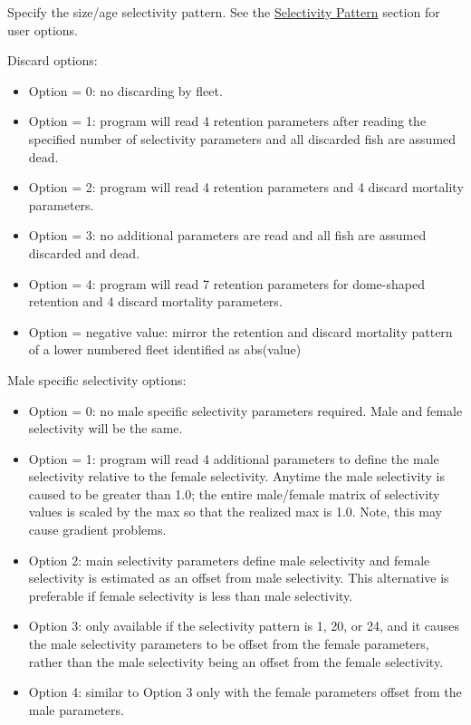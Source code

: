 Specify the size/age selectivity pattern. See the \hyperlink{SelexPattern}{Selectivity Pattern} section for user options.

\hypertarget{DomeRetention}{}
Discard options:
\begin{itemize}
	\item Option = 0: no discarding by fleet.
	\item Option = 1: program will read 4 retention parameters after reading the specified number of selectivity parameters and all discarded fish are assumed dead.
	\item Option = 2: program will read 4 retention parameters and 4 discard mortality parameters.
	\item Option = 3: no additional parameters are read and all fish are assumed discarded and dead.
	\item Option = 4: program will read 7 retention parameters for dome-shaped retention and 4 discard mortality parameters.
	\item Option = negative value: mirror the retention and discard mortality pattern of a lower numbered fleet identified as abs(value)
\end{itemize}

Male specific selectivity options:
\begin{itemize}
	\item Option = 0: no male specific selectivity parameters required. Male and female selectivity will be the same.
	\item Option = 1: program will read 4 additional parameters to define the male selectivity relative to the female selectivity. Anytime the male selectivity is caused to be greater than 1.0; the entire male/female matrix of selectivity values is scaled by the max so that the realized max is 1.0. Note, this may cause gradient problems.
	\item Option 2: main selectivity parameters define male selectivity and female selectivity is estimated as an offset from male selectivity. This alternative is preferable if female selectivity is less than male selectivity.
	\item Option 3: only available if the selectivity pattern is 1, 20, or 24, and it causes the male selectivity parameters to be offset from the female parameters, rather than the male selectivity being an offset from the female selectivity.
	\item Option 4: similar to Option 3 only with the female parameters offset from the male parameters.
\end{itemize}

